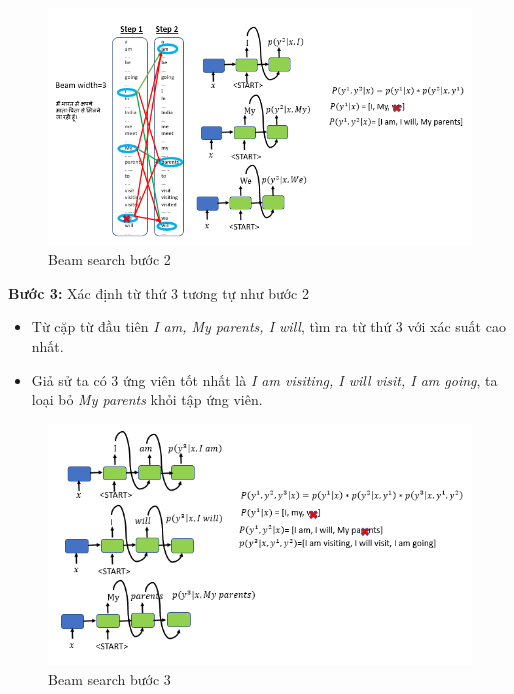 \documentclass[14pt, a4paper]{article}
\numberwithin{equation}{section}
\numberwithin{algorithm}{section}
\numberwithin{figure}{section}
\numberwithin{table}{section}
\numberwithin{dl}{section}
\numberwithin{md}{section}
\numberwithin{bd}{section}
\numberwithin{dn}{section}
\numberwithin{hq}{section}
\begin{document}
\begin{enumerate} [label=(\alph*)]
\begin{figure}[h!]
            \includegraphics[scale=0.5]{Beam_search_3.png}
            \caption{Beam search bước 2}
            \label{fig:Beam_search_3}
    
        \end{figure}

        \textbf{Bước 3:} Xác định từ thứ 3 tương tự như bước 2

        \begin{itemize}
            \item Từ cặp từ đầu tiên \textit{I am, My parents, I will}, tìm ra từ thứ 3 với xác suất cao nhất.
            \item Giả sử ta có 3 ứng viên tốt nhất là \textit{I am visiting, I will visit, I am going}, ta loại bỏ \textit{My parents} khỏi tập ứng viên.
        \end{itemize}

        \begin{figure}[h!] \centering

            \includegraphics[scale=0.5]{Beam_search_4.png}
            \caption{Beam search bước 3}
            \label{fig:Beam_search_4}
    

\end{figure}
\end{enumerate}
\end{document}

